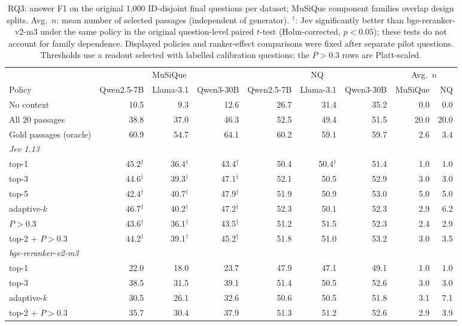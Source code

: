 \begin{table}[t]
\centering
\footnotesize
\setlength{\tabcolsep}{4pt}
\caption{RQ3: answer F1 on the original 1{,}000 ID-disjoint final questions per dataset; MuSiQue component families overlap design splits. Avg.\ $n$: mean number of selected passages (independent of generator). $^\dagger$: Jev significantly better than bge-reranker-v2-m3 under the same policy in the original question-level paired $t$-test (Holm-corrected, $p<0.05$); these tests do not account for family dependence. Displayed policies and ranker-effect comparisons were fixed after separate pilot questions. Thresholds use a readout selected with labelled calibration questions; the $P>0.3$ rows are Platt-scaled.}
\label{tab:rag}
\begin{tabular}{lrrrrrrrr}
\toprule
 & \multicolumn{3}{c}{MuSiQue} & \multicolumn{3}{c}{NQ} & \multicolumn{2}{c}{Avg.\ $n$} \\
Policy & Qwen2.5-7B & Llama-3.1 & Qwen3-30B & Qwen2.5-7B & Llama-3.1 & Qwen3-30B & MuSiQue & NQ \\
\midrule
No context & 10.5 & 9.3 & 12.6 & 26.7 & 31.4 & 35.2 & 0.0 & 0.0 \\
All 20 passages & 38.8 & 37.0 & 46.3 & 52.5 & 49.4 & 51.5 & 20.0 & 20.0 \\
Gold passages (oracle) & 60.9 & 54.7 & 64.1 & 60.2 & 59.1 & 59.7 & 2.6 & 3.4 \\
\multicolumn{9}{l}{\textit{Jev 1.13}} \\
\quad top-1 & 45.2$^\dagger$ & 36.4$^\dagger$ & 43.4$^\dagger$ & 50.4 & 50.4$^\dagger$ & 51.4 & 1.0 & 1.0 \\
\quad top-3 & 44.6$^\dagger$ & 39.3$^\dagger$ & 47.1$^\dagger$ & 52.1 & 50.5 & 52.9 & 3.0 & 3.0 \\
\quad top-5 & 42.4$^\dagger$ & 40.7$^\dagger$ & 47.9$^\dagger$ & 51.9 & 50.9 & 53.0 & 5.0 & 5.0 \\
\quad adaptive-$k$ & 46.7$^\dagger$ & 40.2$^\dagger$ & 47.2$^\dagger$ & 52.3 & 50.1 & 52.3 & 2.9 & 6.2 \\
\quad $P>0.3$ & 43.6$^\dagger$ & 36.1$^\dagger$ & 43.5$^\dagger$ & 51.2 & 51.5 & 52.3 & 2.4 & 2.9 \\
\quad top-2 $+$ $P>0.3$ & 44.2$^\dagger$ & 39.1$^\dagger$ & 45.2$^\dagger$ & 51.8 & 51.0 & 53.2 & 3.0 & 3.5 \\
\multicolumn{9}{l}{\textit{bge-reranker-v2-m3}} \\
\quad top-1 & 22.0 & 18.0 & 23.7 & 47.9 & 47.1 & 49.1 & 1.0 & 1.0 \\
\quad top-3 & 38.5 & 31.5 & 39.1 & 51.4 & 50.5 & 52.6 & 3.0 & 3.0 \\
\quad adaptive-$k$ & 30.5 & 26.1 & 32.6 & 50.6 & 50.5 & 51.8 & 3.1 & 7.1 \\
\quad top-2 $+$ $P>0.3$ & 35.7 & 30.4 & 37.9 & 51.3 & 51.2 & 52.6 & 2.9 & 3.9 \\
\bottomrule
\end{tabular}
\end{table}